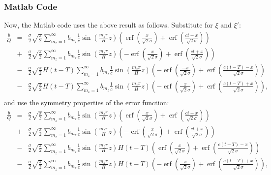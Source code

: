 \documentclass[12pt]{article}
\DeclareMathOperator\erf {erf}
\begin{document}
\subsubsection{Matlab Code}
%
Now, the Matlab code uses the above result as follows. Substitute for $\xi$ and $\xi'$:
%
\begin{eqnarray}
\frac{b}{Q}  & = & \frac{\sigma}{2} \sqrt{ \frac{\pi}{2} } \sum_{m_z = 1}^{\infty} b_{m_z} \frac{1}{ c }\sin \left( \frac{m_z \pi} {H} z\right) \left(  \erf \left( \frac{x}{\sqrt{2} \sigma} \right) +  \erf \left( \frac{ct-x}{\sqrt{2} \sigma} \right)    \right)  \\ \nonumber
& + & \frac{\sigma}{2}  \sqrt{ \frac{\pi}{2} }  \sum_{m_z = 1}^{\infty} b_{m_z} \frac{ 1 }{ c } \sin \left( \frac{m_z \pi} {H} z\right)\left( - \erf \left( \frac{x}{\sqrt{2} \sigma} \right) + \erf \left( \frac{ct+x }{\sqrt{2} \sigma} \right)    \right) \\ \nonumber
& - & \frac{\sigma}{2}  \sqrt{ \frac{\pi}{2} }H(t-T) \sum_{m_z = 1}^{\infty} b_{m_z}  \frac{1 }{ c }  \sin \left( \frac{m_z \pi} {H} z\right) \left(- \erf \left( \frac{-x}{\sqrt{2} \sigma} \right) +  \erf \left( \frac{c(t-T)-x}{\sqrt{2} \sigma} \right)    \right)  \\ \nonumber
& - & \frac{\sigma }{2} \sqrt{ \frac{\pi}{2} }H(t-T)  \sum_{m_z = 1}^{\infty} b_{m_z}  \frac{1}{ c }  \sin \left( \frac{m_z \pi} {H} z\right) \left(- \erf \left( \frac{x}{\sqrt{2} \sigma} \right) +  \erf \left( \frac{c(t-T) + x}{\sqrt{2} \sigma} \right)   \right), \\ \nonumber
\end{eqnarray}
%
and use the symmetry properties of the error function:
%
\begin{eqnarray}
\frac{b}{Q}  & = & \frac{\sigma}{2} \sqrt{ \frac{\pi}{2} } \sum_{m_z = 1}^{\infty} b_{m_z} \frac{1}{ c }\sin \left( \frac{m_z \pi} {H} z\right) \left(  \erf \left( \frac{x}{\sqrt{2} \sigma} \right) +  \erf \left( \frac{ct-x}{\sqrt{2} \sigma} \right)    \right)  \\ \nonumber
& + & \frac{\sigma}{2}  \sqrt{ \frac{\pi}{2} }  \sum_{m_z = 1}^{\infty} b_{m_z} \frac{ 1 }{ c } \sin \left( \frac{m_z \pi} {H} z\right)\left( - \erf \left( \frac{x}{\sqrt{2} \sigma} \right) + \erf \left( \frac{ct+x }{\sqrt{2} \sigma} \right)    \right) \\ \nonumber
& - & \frac{\sigma}{2}  \sqrt{ \frac{\pi}{2} } \sum_{m_z = 1}^{\infty} b_{m_z}  \frac{1 }{ c }  \sin \left( \frac{m_z \pi} {H} z\right) H(t-T)\left( \erf \left( \frac{x}{\sqrt{2} \sigma} \right) +  \erf \left( \frac{c(t-T)-x}{\sqrt{2} \sigma} \right)    \right)  \\ \nonumber
& - & \frac{\sigma }{2} \sqrt{ \frac{\pi}{2} }  \sum_{m_z = 1}^{\infty} b_{m_z}  \frac{1}{ c }  \sin \left( \frac{m_z \pi} {H} z\right) H(t-T)\left(- \erf \left( \frac{x}{\sqrt{2} \sigma} \right) +  \erf \left( \frac{c(t-T) + x}{\sqrt{2} \sigma} \right)    \right), \\ \nonumber
\end{eqnarray}
\end{document}
